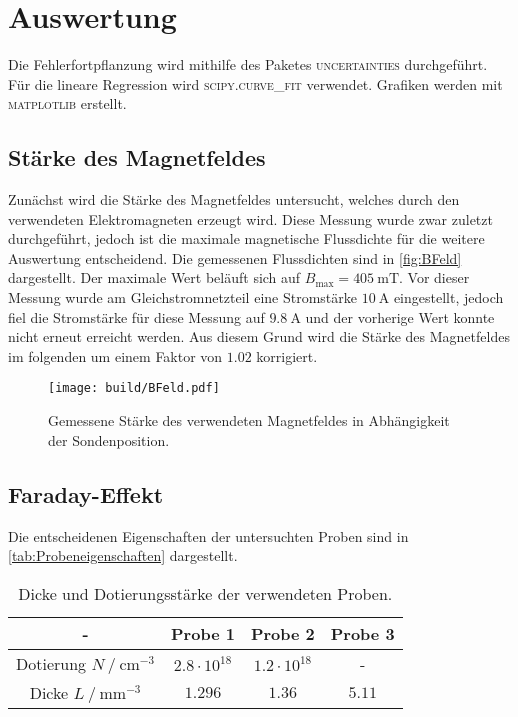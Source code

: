 \section{Auswertung}
\label{sec:auswertung}

Die Fehlerfortpflanzung wird mithilfe des Paketes \textsc{uncertainties} \cite{uncertainties} durchgeführt.
Für die lineare Regression wird \textsc{scipy.curve\_fit} \cite{scipy} verwendet.
Grafiken werden mit \textsc{matplotlib} \cite{matplotlib} erstellt.

\subsection{Stärke des Magnetfeldes}

Zunächst wird die Stärke des Magnetfeldes untersucht, welches durch den verwendeten Elektromagneten erzeugt wird.
Diese Messung wurde zwar zuletzt durchgeführt, jedoch ist die maximale magnetische Flussdichte für die weitere Auswertung entscheidend.
Die gemessenen Flussdichten sind in \autoref{fig:BFeld} dargestellt.
Der maximale Wert beläuft sich auf $B_{\text{max}} = \SI{405}{\milli\tesla}$. 
Vor dieser Messung wurde am Gleichstromnetzteil eine Stromstärke $\SI{10}{\ampere}$ eingestellt, jedoch fiel die Stromstärke für diese Messung auf $\SI{9.8}{\ampere}$
und der vorherige Wert konnte nicht erneut erreicht werden.
Aus diesem Grund wird die Stärke des Magnetfeldes im folgenden um einem Faktor von $1.02$ korrigiert.

\begin{figure}[H]
    \centering
    \texttt{[image: build/BFeld.pdf]}
    \caption{Gemessene Stärke des verwendeten Magnetfeldes in Abhängigkeit der Sondenposition.}
    \label{fig:BFeld}
\end{figure}

\subsection{Faraday-Effekt}

Die entscheidenen Eigenschaften der untersuchten Proben sind in \autoref{tab:Probeneigenschaften} dargestellt.

\begin{table}[H]
    \centering
    \caption{Dicke und Dotierungsstärke der verwendeten Proben.}
    \label{tab:Probeneigenschaften}
    \begin{tabular}{c c c c}
    \toprule
      {-} & {Probe 1} & {Probe 2} & {Probe 3} \\
    \midrule
          {Dotierung $N \mathbin{/} \unit{\centi\meter^{-3}}$}  &  $2.8 \cdot 10^{18}$ & $1.2 \cdot 10^{18}$ &   {-}    \\    
          {Dicke     $L \mathbin{/} \unit{\milli\meter^{-3}}$}  &  $1.296$             & $1.36$              &   $ 5.11$\\    
    \bottomrule
    \end{tabular}
\end{table}

